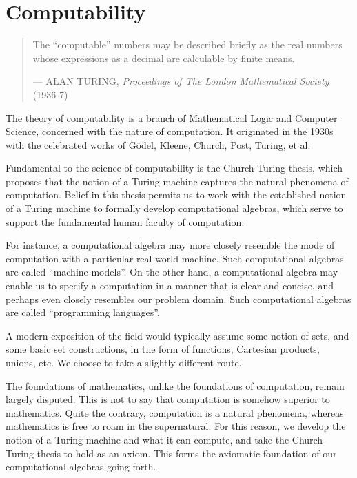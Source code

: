 \chapter{Computability}

\begin{quotation}

\footnotesize\sffamily\itshape

\begin{flushright}

The ``computable'' numbers may be described briefly as the real numbers whose
expressions as a decimal are calculable by finite means.

\smallbreak

\upshape

--- ALAN TURING, {\itshape Proceedings of The London Mathematical Society} (1936-7)

\end{flushright}

\end{quotation}


The theory of computability is a branch of Mathematical Logic and Computer
Science, concerned with the nature of computation. It originated in the 1930s
with the celebrated works of G\"odel, Kleene, Church, Post, Turing, et al.

Fundamental to the science of computability is the Church-Turing thesis, which
proposes that the notion of a Turing machine captures the natural phenomena of
computation. Belief in this thesis permits us to work with the established
notion of a Turing machine to formally develop computational algebras, which
serve to support the fundamental human faculty of computation.

For instance, a computational algebra may more closely resemble the mode of
computation with a particular real-world machine. Such computational algebras
are called ``machine models''. On the other hand, a computational algebra may
enable us to specify a computation in a manner that is clear and concise, and
perhaps even closely resembles our problem domain. Such computational algebras
are called ``programming languages''.

A modern exposition of the field would typically assume some notion of sets,
and some basic set constructions, in the form of functions, Cartesian products,
unions, etc. We choose to take a slightly different route.

The foundations of mathematics, unlike the foundations of computation, remain
largely disputed. This is not to say that computation is somehow superior to
mathematics. Quite the contrary, computation is a natural phenomena, whereas
mathematics is free to roam in the supernatural. For this reason, we develop
the notion of a Turing machine and what it can compute, and take the
Church-Turing thesis to hold as an axiom. This forms the axiomatic foundation
of our computational algebras going forth.

